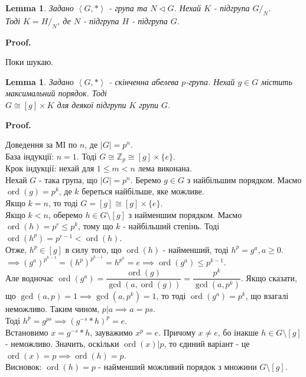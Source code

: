 \documentclass[a4paper, 10pt]{article}
\makeatletter
\theoremstyle{theoremdd}
\theoremstyle{theoremdd}
\theoremstyle{theoremdd}
\theoremstyle{theoremdd}
\theoremstyle{theoremdd}
\theoremstyle{theoremdd}
\theoremstyle{theoremdd}
\theoremstyle{theoremdd}
\theoremstyle{theoremdd}
\theoremstyle{theoremdd}
\theoremstyle{theoremdd}
\theoremstyle{theoremdd}
\theoremstyle{theoremdd}
\newtheorem{lemma}[theorem]{Lemma}
\theoremstyle{theoremdd}
\theoremstyle{theoremdd}
\renewenvironment{proof}[1][Proof.\\]{\par
\pushQED{\hfill \qed}%
\normalfont \topsep6\p@\@plus6\p@\relax
\trivlist
\item\relax
{\bfseries
#1\@addpunct{.}}\hspace\labelsep\ignorespaces
}{%
\popQED\endtrivlist\@endpefalse
}
\DeclareMathOperator{\ord}{ord}
\makeatother
\begin{document}
\begin{lemma}
Задано $\left< G,*\right>$ - група та $N \triangleleft G$. Нехай $K$ - підгрупа $G/_N$. \\
Тоді $K = H/_N$, де $N$ - підгрупа $H$ - підгрупа $G$.
\end{lemma}

\begin{proof}
Поки шукаю.
\end{proof}

\begin{lemma}
Задано $\left< G, * \right>$ - скінченна абелева $p$-група. Нехай $g \in G$ містить максимальний порядок. Тоді\\
$G \cong [g] \times K$ для деякої підгрупи $K$ групи $G$.
\end{lemma}

\begin{proof}
Доведення за МІ по $n$, де $|G| = p^n$.\\
База індукції: $n = 1$. Тоді $G \cong \mathbb{Z}_p \cong [g] \times \{e\}$.\\
Крок індукції: нехай для $1 \leq m < n$ лема виконана.\\
Нехай $G$ - така група, що $|G| = p^n$. Беремо $g \in G$ з найбільшим порядком. Маємо $\ord(g) = p^k$, де $k$ береться найбільше, яке можливе.\\
Якщо $k = n$, то тоді $G = [g] \cong [g] \times \{e\}$.\\
Якщо $k < n$, оберемо $h \in G \setminus [g]$ з найменшим порядком. Маємо $\ord(h) = p^r \leq p^k$, тому що $k$ - найбільший степінь. Тоді $\ord(h^p) = p^{r-1} < \ord(h)$.\\
Отже, $h^p \in [g]$ в силу того, що $\ord(h)$ - найменший, тоді $h^p = g^a, a \geq 0$.\\
$\implies (g^a)^{p^{k-1}} = (h^p)^{p^{k-1}} = h^{p^k} = e \implies \ord(g^a) \leq p^{k-1}$.\\
Але водночас $\ord(g^a) = \dfrac{\ord(g)}{\gcd(a,\ord(g))} = \dfrac{p^k}{\gcd(a,p^k)}$. Якщо сказати, що $\gcd(a,p) = 1 \implies \gcd(a,p^k) = 1$, то тоді $\ord(g^a) = p^k$, що взагалі неможливо. Таким чином, $p | a \implies a = ps$.\\
Тоді $h^{p} = g^{ps} \implies (g^{-s}*h)^p = e$.\\
Встановимо $x = g^{-s}*h$, зауважимо $x^p = e$. Причому $x \neq e$, бо інакше $h \in G \setminus [g]$ - неможливо. Значить, оскільки $\ord(x) | p$, то єдиний варіант - це $\ord(x) = p \implies \ord(h) = p$.\\
Висновок: $\ord(h) = p$ - найменший можливий порядок з множини $G \setminus [g]$. \bigskip \\

\end{proof}
\end{document}
